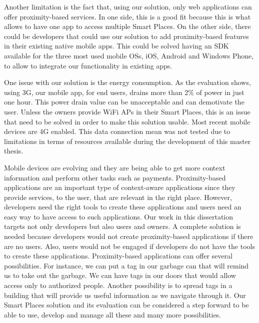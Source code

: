 Another limitation is the fact that, using our solution, only web applications can offer proximity-based services.
In one side, this is a good fit because this is what allows to have one app to access multiple Smart Places.
On the other side, there could be developers that could use our solution to add proximity-based features in their existing native mobile apps.
This could be solved having an \gls{SDK} available for the three most used mobile \glspl{OS}, iOS, Android and Windows Phone, to allow to integrate our functionality in existing apps.

One issue with our solution is the energy consumption.
As the evaluation shows, using \gls{3G}, our mobile app, for end users, drains more than 2\% of power in just one hour. This power drain value can be unacceptable and can demotivate the user.
Unless the owners provide \gls{WiFi} \glspl{AP} in their Smart Places, this is an issue that need to be solved in order to make this solution usable.
Most recent mobile devices are \gls{4G} enabled.
This data connection mean was not tested due to limitations in terms of resources available during the development of this master thesis.

Mobile devices are evolving and they are being able to get more context information and perform other tasks such as payments.
Proximity-based applications are an important type of context-aware applications since they provide services, to the user, that are relevant in the right place.
However, developers need the right tools to create these applications and users need an easy way to have access to such applications.
Our work in this dissertation targets not only developers but also users and owners.
A complete solution is needed because developers would not create proximity-based applications if there are no users.
Also, users would not be engaged if developers do not have the tools to create these applications.
Proximity-based applications can offer several possibilities.
For instance, we can put a tag in our garbage can that will remind us to take out the garbage.
We can have tags in our doors that would allow access only to authorized people.
Another possibility is to spread tags in a building that will provide us useful information as we navigate through it.
Our Smart Places solution and its evaluation can be considered a step forward to be able to use, develop and manage all these and many more possibilities.
